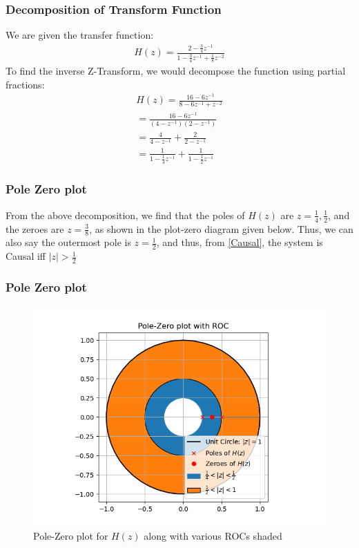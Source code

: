 \documentclass{beamer}
\providecommand{\abs}[1]{\left\vert#1\right\vert}
\begin{document}
\begin{frame}
    \frametitle{Decomposition of Transform Function}
    \begin{flushleft}
     We are given the transfer function:
\begin{align}
    H(z) = \frac{2 - \frac{3}{4}z^{-1}}{1 - \frac{3}{4}z^{-1} + \frac{1}{8}z^{-2}}
\end{align}
To find the inverse Z-Transform, we would decompose the function using partial fractions:
\begin{align}
    H(z) = \frac{16 - 6z^{-1}}{8 - 6z^{-1} + z^{-2}}\\
     = \frac{16 - 6z^{-1}}{(4 - z^{-1})(2 - {z^{-1}})}\\
      = \frac{4}{4 - z^{-1}} +\frac{2}{2 - z^{-1}}\\
       = \frac{1}{1 - \frac{1}{4}z^{-1}} + \frac{1}{1 - \frac{1}{2}z^{-1}}
       \label{partial-fraction}
\end{align}
  \end{flushleft}
\end{frame}

\begin{frame}
    \frametitle{Pole Zero plot}
    \begin{flushleft}
    From the above decomposition, we find that the poles of $H(z)$ are $z = \frac{1}{4} , \frac{1}{2}$, and the zeroes are $z = \frac{3}{8}$, as shown in the plot-zero diagram given below.
Thus, we can also say the outermost pole is $z = \frac{1}{2}$, and thus, from \eqref{Causal}, the system is Causal iff $\abs{z} > \frac{1}{2}$
\end{flushleft}
\end{frame}


\begin{frame}
    \frametitle{Pole Zero plot}
    \begin{flushleft}
    
\begin{figure}[!ht]
\centering
 \includegraphics[width=\columnwidth]{graphs/pole_zero_with_ROC.png}
 \caption{Pole-Zero plot for $H(z)$ along with various ROCs shaded}
 \end{figure}
\end{flushleft}
\end{frame}
\end{document}

